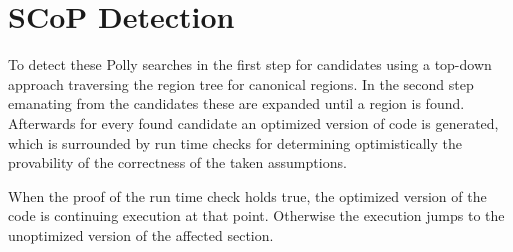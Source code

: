 \section{SCoP Detection}
To detect these \scops Polly searches in the first step for candidates using a top-down approach traversing the region tree for canonical regions.
In the second step emanating from the candidates these are expanded until a  region is found.
Afterwards for every found candidate an optimized version of code is generated, which is surrounded by run time checks for determining optimistically the provability of the correctness of the taken assumptions.

When the proof of the run time check holds true, the optimized version of the code is continuing execution at that point.
Otherwise the execution jumps to the unoptimized version of the affected section.
